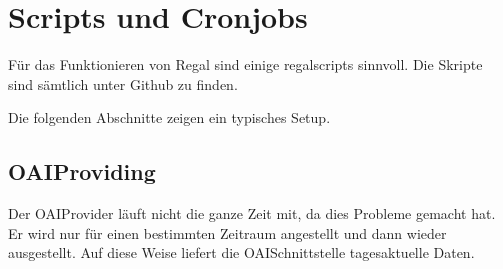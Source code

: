 \documentclass[letterpaper,10pt,english]{sphinxmanual}
\begin{document}
\begin{sphinxVerbatim}[commandchars=\\\{\}]
     
            
        

     
            
        
\end{sphinxVerbatim}


\section{Scripts und Cronjobs}
\label{\detokenize{toscience:scripts-und-cronjobs}}\label{\detokenize{toscience:id75}}
\sphinxAtStartPar
Für das Funktionieren von Regal sind einige regal\sphinxhyphen{}scripts sinnvoll. Die
Skripte sind sämtlich unter Github zu finden.

\sphinxAtStartPar
{}

\sphinxAtStartPar
Die folgenden Abschnitte zeigen ein typisches Setup.


\subsection{OAI\sphinxhyphen{}Providing}
\label{\detokenize{toscience:oai-providing-2}}\label{\detokenize{toscience:id76}}
\sphinxAtStartPar
Der OAI\sphinxhyphen{}Provider läuft nicht die ganze Zeit mit, da dies Probleme
gemacht hat. Er wird nur für einen bestimmten Zeitraum angestellt und
dann wieder ausgestellt. Auf diese Weise liefert die OAI\sphinxhyphen{}Schnittstelle
tagesaktuelle Daten.

\begin{sphinxVerbatim}[commandchars=\\\{\}]
     
     
\end{sphinxVerbatim}
\end{document}
